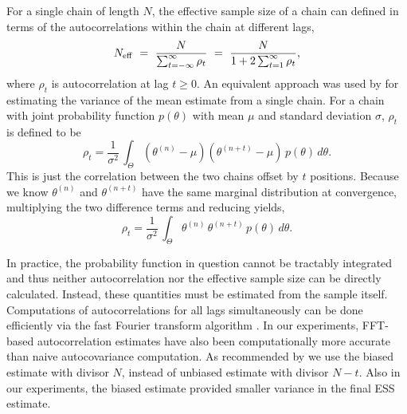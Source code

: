 \documentclass[american,]{article}
\theoremstyle{definition}
\begin{document}
For a single chain of length $N$, the effective sample size of a
chain can defined in terms of the autocorrelations within the chain at
different lags,
\begin{equation}
N_{\rm eff} \ = \
\frac{N}{\sum_{t = -\infty}^{\infty} \rho_t} \ = \
\frac{N}{1 + 2 \sum_{t = 1}^{\infty} \rho_t},
\end{equation}
where \(\rho_t\) is autocorrelation at lag \(t \geq 0\).  An
equivalent approach was used by \citet{Hastings:1970} for
estimating the variance of the mean estimate from a single chain. For a chain
with joint probability function \(p(\theta)\) with mean \(\mu\) and
standard deviation \(\sigma\), \(\rho_t\) is defined to be
\begin{equation}
\rho_t = \frac{1}{\sigma^2} \, \int_{\Theta} (\theta^{(n)} - \mu)
(\theta^{(n+t)} - \mu) \, p(\theta) \, d \theta.
\end{equation}
This is just the correlation between the two chains offset by \(t\)
positions. Because we know \(\theta^{(n)}\) and \(\theta^{(n+t)}\) have
the same marginal distribution at convergence, multiplying the two
difference terms and reducing yields,
\begin{equation}
\rho_t = \frac{1}{\sigma^2} \, \int_{\Theta} \theta^{(n)} \, \theta^{(n+t)}
\, p(\theta) \, d \theta.
\end{equation}

In practice, the probability function in question cannot be tractably
integrated and thus neither autocorrelation nor the effective sample
size can be directly calculated. Instead, these quantities must be
estimated from the sample itself.
%
Computations of autocorrelations for all lags simultaneously can be
done efficiently via the fast Fourier transform algorithm \citep[FFT;
see][]{Geyer:2011}. In our experiments, FFT-based autocorrelation
estimates have also been computationally more accurate than naive
autocovariance computation. As recommended by \citet{Geyer:1992} we
use the biased estimate with divisor $N$, instead of unbiased
estimate with divisor $N-t$. Also in our experiments, the biased
estimate provided smaller variance in the final ESS estimate.
\end{document}

